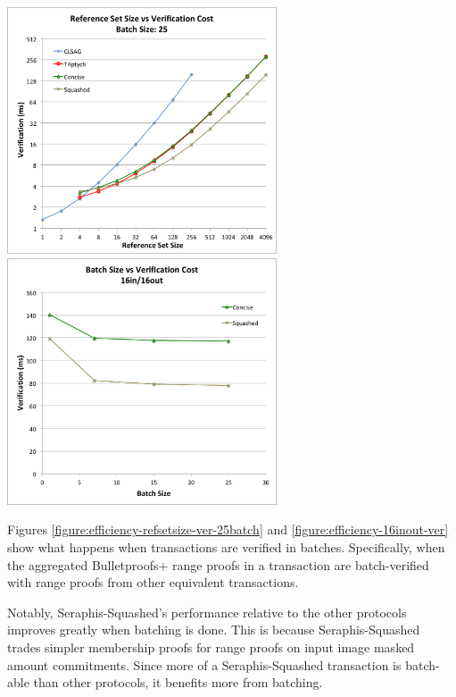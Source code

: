 \begin{center}
    \includegraphics[width=8cm]{figures/refset_25batch_ver.png}
    \includegraphics[width=8cm]{figures/16inout_ver.png}
    \label{figure:efficiency-refsetsize-ver-25batch}
    \label{figure:efficiency-16inout-ver}
\end{center}

Figures \ref{figure:efficiency-refsetsize-ver-25batch} and \ref{figure:efficiency-16inout-ver} show what happens when transactions are verified in batches. Specifically, when the aggregated Bulletproofs+ range proofs in a transaction are batch-verified with range proofs from other equivalent transactions.

Notably, Seraphis-Squashed's performance relative to the other protocols improves greatly when batching is done. This is because Seraphis-Squashed trades simpler membership proofs for range proofs on input image masked amount commitments. Since more of a Seraphis-Squashed transaction is batch-able than other protocols, it benefits more from batching.

